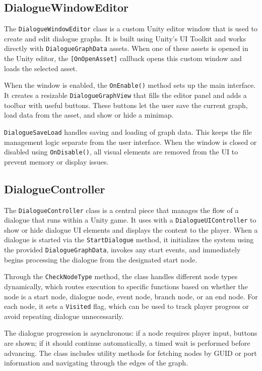  
\subsection{DialogueWindowEditor}
The \verb|DialogueWindowEditor| class is a custom Unity editor window that is used to create and edit dialogue graphs. It is built using Unity’s UI Toolkit and works directly with \verb|DialogueGraphData| assets. When one of these assets is opened in the Unity editor, the \verb|[OnOpenAsset]| callback opens this custom window and loads the selected asset.

When the window is enabled, the \verb|OnEnable()| method sets up the main interface. It creates a resizable \verb|DialogueGraphView| that fills the editor panel and adds a toolbar with useful buttons. These buttons let the user save the current graph, load data from the asset, and show or hide a minimap.

\verb|DialogueSaveLoad| handles saving and loading of graph data. This keeps the file management logic separate from the user interface. When the window is closed or disabled using \verb|OnDisable()|, all visual elements are removed from the UI to prevent memory or display issues.


\subsection{DialogueController }
The \verb|DialogueController| class is a central piece that manages the flow of a dialogue that runs within a Unity game. It uses with a \verb|DialogueUIController| to show or hide dialogue UI elements and displays the content to the player. When a dialogue is started via the \verb|StartDialogue| method, it initializes the system using the provided \verb|DialogueGraphData|, invokes any start events, and immediately begins processing the dialogue from the designated start node.

Through the \verb|CheckNodeType| method, the class handles different node types dynamically, which routes execution to specific functions based on whether the node is a start node, dialogue node, event node, branch node, or an end node. For each node, it sets a \verb|Visited| flag, which can be used to track player progress or avoid repeating dialogue unnecessarily.

The dialogue progression is asynchronous: if a node requires player input, buttons are shown; if it should continue automatically, a timed wait is performed before advancing. The class includes utility methods for fetching nodes by GUID or port information and navigating through the edges of the graph.

